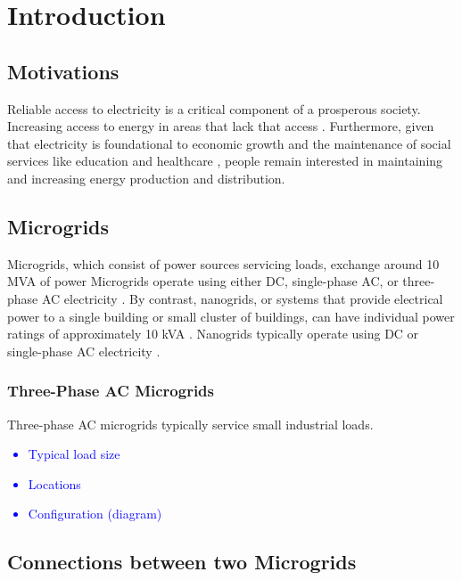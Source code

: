 \chapter{Introduction} \label{Introduction}

\section{Motivations}
Reliable access to electricity is a critical component of a prosperous society. Increasing access to energy in areas that lack that access \cite{international2022world}. Furthermore, given that electricity is foundational to economic growth and the maintenance of social services like education and healthcare \cite{owid-sdgs-affordable-clean-energy}, people remain interested in maintaining and increasing energy production and distribution. 

\section{Microgrids} \label{Introduction:Microgrid}
Microgrids, which consist of power sources servicing loads, exchange around 10 MVA of power \cite{Uddin_Microgrid_Scale, Trends_in_Microgrid} Microgrids operate using either DC, single-phase AC, or three-phase AC electricity \cite{Uddin_Microgrid_Scale}. By contrast, nanogrids, or systems that provide electrical power to a single building or small cluster of buildings, can have individual power ratings of approximately 10 kVA \cite{Pindoriya_Nanogrid_Rating}. Nanogrids typically operate using DC or single-phase AC electricity \cite{Jie_Nanogrid_Rating, Pindoriya_Nanogrid_Rating}. 

\subsection{Three-Phase AC Microgrids}

Three-phase AC microgrids typically service small industrial loads.

\textcolor{blue}{
\begin{itemize}
    \item Typical load size
    \item Locations
    \item Configuration (diagram)
\end{itemize}
}

\section{Connections between two Microgrids}

